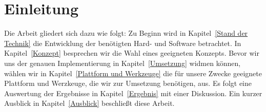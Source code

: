 
\chapter{Einleitung}\label{Einleitung}

\medskip
Die Arbeit gliedert sich dazu wie folgt: Zu Beginn wird in Kapitel~\ref{Stand der Technik} die Entwicklung der benötigten Hard- und Software betrachtet. In Kapitel~\ref{Konzept} besprechen wir die Wahl eines geeigneten Konzepts. Bevor wir uns der genauen Implementierung in Kapitel~\ref{Umsetzung} widmen können, wählen wir in Kapitel~\ref{Plattform und Werkzeuge} die für unsere Zwecke geeignete Plattform und Werzkeuge, die wir zur Umsetzung benötigen, aus. Es folgt eine Auswertung der Ergebnisse in Kapitel~\ref{Ergebnis} mit einer Diskussion. Ein kurzer Ausblick in Kapitel~\ref{Ausblick} beschließt diese Arbeit.